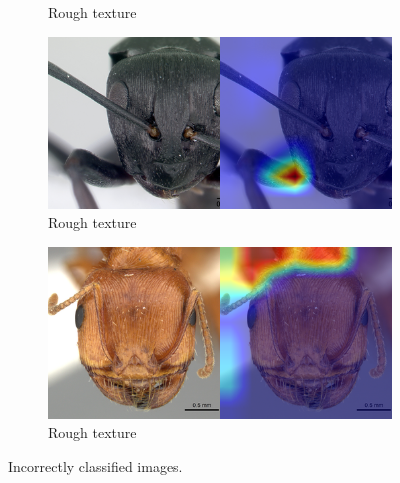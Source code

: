\documentclass{aci}
\numberwithin{equation}{section}
\begin{document}
\begin{figure}
\begin{subfigure}{\subwidth}
        \caption*{Rough texture}
        \label{fig:incorrect_nonideal_22}
    \end{subfigure}
    \begin{subfigure}{\subwidth}
        \includegraphics[width=1\linewidth]{thesis_assets/gradcam/incorrect_nonideal/61.png}
        \caption*{Rough texture}
        \label{fig:incorrect_nonideal_61}
    \end{subfigure}
    \begin{subfigure}{\subwidth}
        \includegraphics[width=1\linewidth]{thesis_assets/gradcam/incorrect_nonideal/204.png}
        \caption*{Rough texture}
        \label{fig:incorrect_nonideal_204}
    \end{subfigure}
    \caption{Incorrectly classified images.}
    \label{fig:incorrect_images}
\end{figure}

\FloatBarrier
\end{document}

